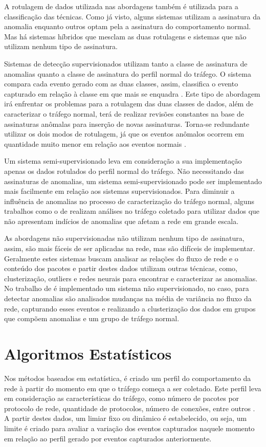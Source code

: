 \indent A rotulagem de dados utilizada nas abordagens também é utilizada para a classificação das técnicas. Como já visto, alguns sistemas utilizam a assinatura da anomalia enquanto outros optam pela a assinatura do comportamento normal. Mas há sistemas híbridos que mesclam as duas rotulagens e sistemas que não utilizam nenhum tipo de assinatura.

\indent Sistemas de detecção supervisionados utilizam tanto a classe de assinatura de anomalias quanto a classe de assinatura do perfil normal do tráfego. O sistema compara cada evento gerado com as duas classes, assim, classifica o evento capturado em relação à classe em que mais se enquadra \cite{chandola2009}. Este tipo de abordagem irá enfrentar os problemas para a rotulagem das duas classes de dados, além de caracterizar o tráfego normal, terá de realizar revisões constantes na base de assinaturas anômalas para inserção de novas assinaturas. Torna-se redundante utilizar os dois modos de rotulagem, já que os eventos anômalos ocorrem em quantidade muito menor em relação aos eventos normais \cite{Bhuyan}.

\indent Um sistema semi-supervisionado leva em consideração a sua implementação apenas os dados rotulados do perfil normal do tráfego. Não necessitando das assinaturas de anomalias, um sistema semi-supervisionado pode ser implementado mais facilmente em relação aos sistemas supervisionados. Para diminuir a influência de anomalias no processo de caracterização do tráfego normal, alguns trabalhos como o de  realizam análises no tráfego coletado para utilizar dados que não apresentam indícios de anomalias que afetam a rede em grande escala.

\indent As abordagens não supervisionadas não utilizam nenhum tipo de assinatura, assim, são mais fáceis de ser aplicadas na rede, mas são difíceis de implementar. Geralmente estes sistemas buscam analisar as relações do fluxo de rede e o conteúdo dos pacotes e partir destes dados utilizam outras técnicas, como, clusterização, outliers e redes neurais para encontrar e caracterizar as anomalias. No trabalho de  é implementado um sistema não supervisionado, no caso, para detectar anomalias são analisados mudanças na média de variância no fluxo da rede, capturando esses eventos e realizando a clusterização dos dados em grupos que compõem anomalias e um grupo de tráfego normal.


  \section{Algoritmos Estatísticos}
\indent Nos métodos baseados em estatística, é criado um perfil do comportamento da rede à partir do momento em que o tráfego começa a ser coletado. Este perfil leva em consideração as características do tráfego, como número de pacotes por protocolo de rede, quantidade de protocolos, número de conexões, entre outros \cite{perlin2011}. A partir destes dados, um limiar fixo ou dinâmico é estabelecido, ou seja, um limite é criado para avaliar a variação dos eventos capturados naquele momento em relação ao perfil gerado por eventos capturados anteriormente.

